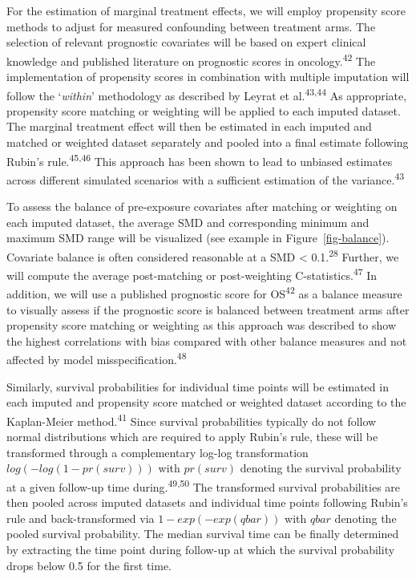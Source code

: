 \documentclass[
  letterpaper,
  DIV=11,
  numbers=noendperiod]{scrartcl}
\begin{document}
For the estimation of marginal treatment effects, we will employ
propensity score methods to adjust for measured confounding between
treatment arms. The selection of relevant prognostic covariates will be
based on expert clinical knowledge and published literature on
prognostic scores in oncology.\textsuperscript{42} The implementation of
propensity scores in combination with multiple imputation will follow
the `\emph{within}' methodology as described by Leyrat et
al.\textsuperscript{43,44} As appropriate, propensity score matching or
weighting will be applied to each imputed dataset. The marginal
treatment effect will then be estimated in each imputed and matched or
weighted dataset separately and pooled into a final estimate following
Rubin's rule.\textsuperscript{45,46} This approach has been shown to
lead to unbiased estimates across different simulated scenarios with a
sufficient estimation of the variance.\textsuperscript{43}

To assess the balance of pre-exposure covariates after matching or
weighting on each imputed dataset, the average SMD and corresponding
minimum and maximum SMD range will be visualized (see example in
Figure~\ref{fig-balance}). Covariate balance is often considered
reasonable at a SMD \textless{} 0.1.\textsuperscript{28} Further, we
will compute the average post-matching or post-weighting
C-statistics.\textsuperscript{47} In addition, we will use a published
prognostic score for OS\textsuperscript{42} as a balance measure to
visually assess if the prognostic score is balanced between treatment
arms after propensity score matching or weighting as this approach was
described to show the highest correlations with bias compared with other
balance measures and not affected by model
misspecification.\textsuperscript{48}

Similarly, survival probabilities for individual time points will be
estimated in each imputed and propensity score matched or weighted
dataset according to the Kaplan-Meier method.\textsuperscript{41} Since
survival probabilities typically do not follow normal distributions
which are required to apply Rubin's rule, these will be transformed
through a complementary log-log transformation \(log(-log(1-pr(surv)))\)
with \(pr(surv)\) denoting the survival probability at a given follow-up
time during.\textsuperscript{49,50} The transformed survival
probabilities are then pooled across imputed datasets and individual
time points following Rubin's rule and back-transformed via
\(1-exp(-exp(qbar))\) with \(qbar\) denoting the pooled survival
probability. The median survival time can be finally determined by
extracting the time point during follow-up at which the survival
probability drops below 0.5 for the first time.
\end{document}
